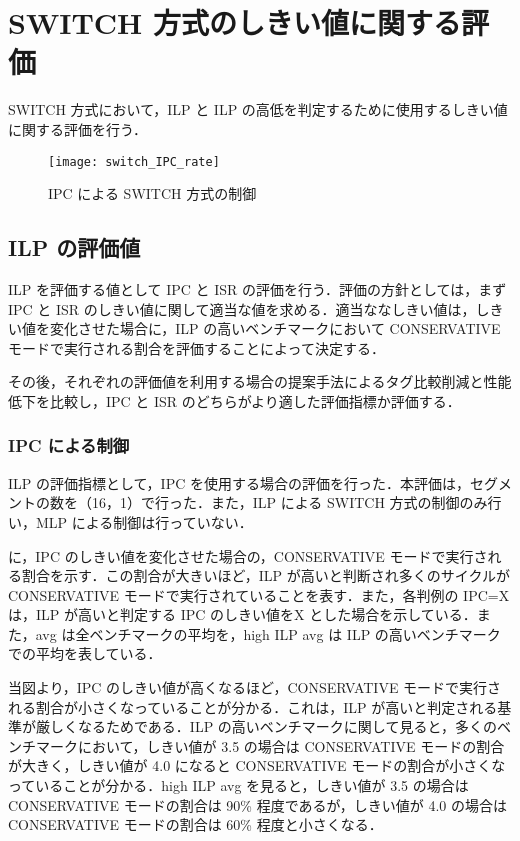\section{SWITCH 方式のしきい値に関する評価}
\label{sec:eval_threshold}
SWITCH 方式において，ILP と ILP の高低を判定するために使用するしきい値に関する評価を行う．

\begin{figure}[htb]
  \centering
  \texttt{[image: switch\_IPC\_rate]}
  \caption{IPC による SWITCH 方式の制御}
  \label{fig:switch_IPC_rate}
\end{figure}

\subsection{ILP の評価値}
ILP を評価する値として IPC と ISR の評価を行う．評価の方針としては，まず IPC と ISR のしきい値に関して適当な値を求める．適当ななしきい値は，しきい値を変化させた場合に，ILP の高いベンチマークにおいて CONSERVATIVE モードで実行される割合を評価することによって決定する．

その後，それぞれの評価値を利用する場合の提案手法によるタグ比較削減と性能低下を比較し，IPC と ISR のどちらがより適した評価指標か評価する．

\subsubsection{IPC による制御}
ILP の評価指標として，IPC を使用する場合の評価を行った．本評価は，セグメントの数を（16，1）で行った．また，ILP による SWITCH 方式の制御のみ行い，MLP による制御は行っていない．

に，IPC のしきい値を変化させた場合の，CONSERVATIVE モードで実行される割合を示す．この割合が大きいほど，ILP が高いと判断され多くのサイクルが CONSERVATIVE モードで実行されていることを表す．また，各判例の IPC=X は，ILP が高いと判定する IPC のしきい値をX とした場合を示している．また，avg は全ベンチマークの平均を，high ILP avg は ILP の高いベンチマークでの平均を表している． 

当図より，IPC のしきい値が高くなるほど，CONSERVATIVE モードで実行される割合が小さくなっていることが分かる．これは，ILP が高いと判定される基準が厳しくなるためである．ILP の高いベンチマークに関して見ると，多くのベンチマークにおいて，しきい値が 3.5 の場合は CONSERVATIVE モードの割合が大きく，しきい値が 4.0 になると CONSERVATIVE モードの割合が小さくなっていることが分かる．high ILP avg を見ると，しきい値が 3.5 の場合は CONSERVATIVE モードの割合は 90\% 程度であるが，しきい値が 4.0 の場合は CONSERVATIVE モードの割合は 60\% 程度と小さくなる．

